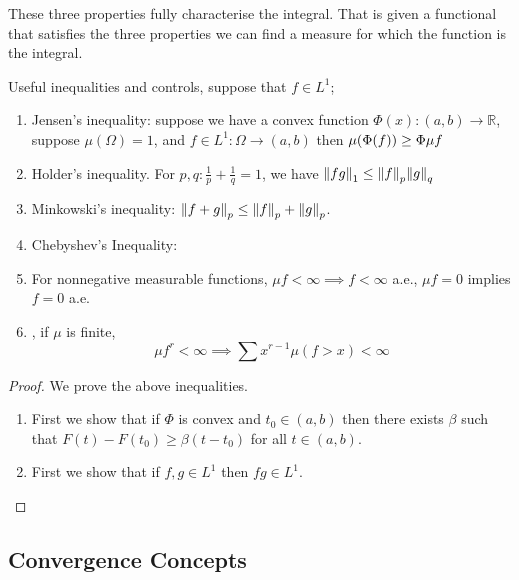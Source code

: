 \begin{remark}
    These three properties fully characterise the integral. That is given a functional that satisfies the three properties we can find a measure for which the function is the integral. 
\end{remark}

\begin{thm}
    Useful inequalities and controls, suppose that \(f \in L^{1}\);
    \begin{enumerate}
        \item Jensen's inequality: suppose we have a convex function \(\Phi(x): (a,b) \to \mathbb{R}\), suppose \(\mu(\Omega)=1\), and \(f \in L^{1}: \Omega \to (a,b) \) then \(\mu\pqty{\Phi(f)} \geq \Phi \mu f\)
        \item Holder's inequality. For \(p,q: \frac{1}{p} + \frac{1}{q} = 1\), we have \(\norm{fg}_{1} \leq \norm{f}_{p} \norm{g}_{q}\)
        \item Minkowski's inequality: \(\norm{f + g}_{p} \leq \norm{f}_{p} + \norm{g}_{p}\).
        \item Chebyshev's Inequality: 
        \item For nonnegative measurable functions, \(\mu f < \infty  \implies f < \infty\) a.e., \(\mu f = 0\) implies \(f = 0\) a.e. 
        \item {}, if \(\mu\) is finite, 
        \begin{equation*}
            \mu f^{r} < \infty \implies \sum x^{r - 1} \mu(f> x) < \infty
        \end{equation*}
    \end{enumerate}    
\end{thm}

\begin{proof}
    We prove the above inequalities. 
    \begin{enumerate}
        \item First we show that if \(\Phi\) is convex and \(t_{0}\in (a,b)\) then there exists \(\beta\) such that \(F(t) - F(t_{0}) \geq \beta(t-t_{0})\) for all \( t \in (a,b)\).  
            
        \item First we show that if \(f, g  \in L^{1}\) then \(fg \in L^{1}\). 
    \end{enumerate}
\end{proof}


\begin{thm}

\end{thm}

\subsection{Convergence Concepts}


\begin{thm}
    
\end{thm}

\begin{thm}
    
\end{thm}

\subsection{}
